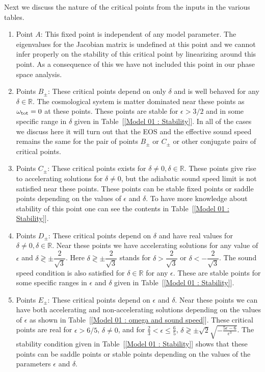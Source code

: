 \documentclass[a4paper,12pt]{article}
\begin{document}
Next we discuss the nature of the critical points from the inputs in the various tables.
\begin{enumerate}
\item Point $A$: This fixed point is independent of any model parameter.  The eigenvalues for the Jacobian matrix is undefined at this point and we cannot infer properly on the stability of this critical point by linearizing around this point. As a consequence of this we have not included this point in our phase space analysis.
		
\item Points $ B_{\pm} $: These critical points depend on only $\delta$
and is well behaved for any $\delta \in \mathbb{R}$. The cosmological system is matter dominated near these points as $\omega_{\rm tot} =0$ at these points. These points are stable for $\epsilon>3/2$ and in some specific range in $\delta$ given in Table~[\ref{Model 01 : Stability}]. In all of the cases we discuss here it will turn out that the EOS and the effective sound speed remains the same for the pair of points $B_\pm$ or $C_\pm$ or other conjugate pairs of critical points.
		
\item Points $ C_{\pm} $: These critical points exists for $\delta \ne 0, \delta \in \mathbb{R}$. These points give rise to accelerating solutions for $\delta \ne 0$, but the adiabatic sound speed limit is not satisfied near these points.  These points can be stable fixed points or saddle points depending on the values of $\epsilon$ and $\delta$. To have more knowledge about  stability of this point one can see the contents in Table~[\ref{Model 01 : Stability}]. 
		
\item Points $ D_{\pm} $: These critical points depend on $\delta$ and have real values for $ \delta \ne 0, \delta \in \mathbb{R} $. Near these points we have accelerating solutions for any value of $\epsilon$ and $\delta \gtrless \pm \dfrac{2}{\sqrt{3}}$. Here $\delta \gtrless \pm \dfrac{2}{\sqrt{3}}$ stands for
$\delta > \dfrac{2}{\sqrt{3}}$ or $\delta < -\dfrac{2}{\sqrt{3}}$.
The sound speed condition is also satisfied for $ \delta \in \mathbb{R}$ for any $\epsilon$. These are stable points for some specific ranges in $\epsilon$ and $\delta$ given in Table~[\ref{Model 01 : Stability}]. 
		
\item Points $ E_{\pm} $: These critical points depend on $\epsilon$ and $ \delta $. Near these points we can have both accelerating and non-accelerating solutions depending on the values of $\epsilon$ as shown in Table~[\ref{Model 01 : omega and sound speed}]. These critical points are real for $ \epsilon > 6/5 $, $ \delta  \ne 0$, and for $ \frac{2}{3}<\epsilon \leq \frac{6}{5} $, $ \delta \gtrless \pm \sqrt{2} \sqrt{-\frac{5 \epsilon -6}{\epsilon ^3}} $. The stability condition given in Table~[\ref{Model 01 : Stability}] shows that these points can be saddle points or stable points depending on the values of the parameters $\epsilon$ and $\delta$.
\end{enumerate}  
\end{document}
